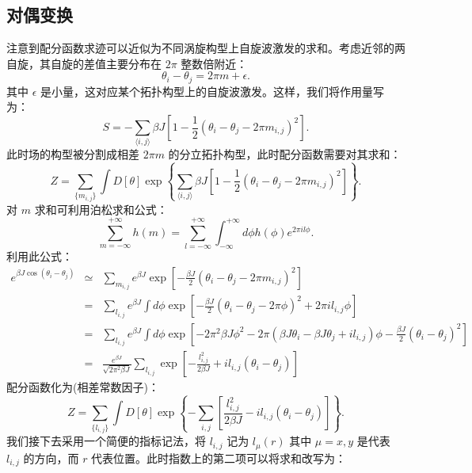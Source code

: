 \documentclass[10pt,UTF8]{ctexart}
\begin{document}
\subsection*{对偶变换}
\noindent
注意到配分函数求迹可以近似为不同涡旋构型上自旋波激发的求和。考虑近邻的两自旋，其自旋的差值主要分布在 $2\pi$ 整数倍附近：
\begin{equation}
	\theta_i - \theta_j = 2\pi m + \epsilon.
\end{equation}
其中 $\epsilon$ 是小量，这对应某个拓扑构型上的自旋波激发。这样，我们将作用量写为：
\begin{equation}
	S = -\sum_{\langle i,j \rangle} \beta J \left[1-\frac{1}{2}(\theta_i-\theta_j-2\pi m_{i,j})^2 \right].
\end{equation}
此时场的构型被分割成相差 $2\pi m$ 的分立拓扑构型，此时配分函数需要对其求和：
\begin{equation}
	Z = \sum_{\{m_{i,j}\}}\int D[\theta] \exp\left\{\sum_{\langle i,j \rangle} \beta J \left[1-\frac{1}{2}(\theta_i-\theta_j-2\pi m_{i,j})^2 \right] \right\}.
\end{equation}
对 $m$ 求和可利用泊松求和公式：
\begin{equation}
	\sum_{m=-\infty}^{+\infty} h(m) = \sum_{l=-\infty}^{+\infty} \int_{-\infty}^{+\infty} d\phi h(\phi) e^{2\pi il\phi}.
\end{equation}
利用此公式：
\begin{eqnarray}
	e^{\beta J \cos(\theta_i-\theta_j)} 
	& \simeq & \sum_{m_{i,j}} e^{\beta J} \exp\left[-\frac{\beta J}{2}(\theta_i-\theta_j-2\pi m_{i,j})^2\right] \nonumber \\
	&=& \sum_{l_{i,j}}e^{\beta J} \int d\phi \exp\left[-\frac{\beta J}{2}(\theta_i-\theta_j-2\pi \phi)^2+2\pi i l_{i,j}\phi \right] \nonumber \\
	&=& \sum_{l_{i,j}}e^{\beta J} \int d\phi \exp\left[
		-2\pi^2\beta J\phi^2-2\pi(\beta J\theta_i-\beta J\theta_j+il_{i,j})\phi-\frac{\beta J}{2}(\theta_i-\theta_j)^2
		\right] \nonumber \\
	&=& \frac{e^{\beta J}}{\sqrt{2\pi^2\beta J}}\sum_{l_{i,j}} \exp\left[-\frac{l_{i,j}^2}{2\beta J} + il_{i,j}(\theta_i-\theta_j)\right]
\end{eqnarray}
配分函数化为(相差常数因子)：
\begin{equation}
	Z = \sum_{\{l_{i,j}\}}\int D[\theta] \exp\left\{-\sum_{i,j}\left[\frac{l_{i,j}^2}{2\beta J} - il_{i,j}(\theta_i-\theta_j)\right] \right\}.
\end{equation}
我们接下去采用一个简便的指标记法，将 $l_{i,j}$ 记为 $l_\mu(r)$ 其中 $\mu=x,y$ 是代表 $l_{i,j}$ 的方向，而 $r$ 代表位置。此时指数上的第二项可以将求和改写为：
\end{document}
